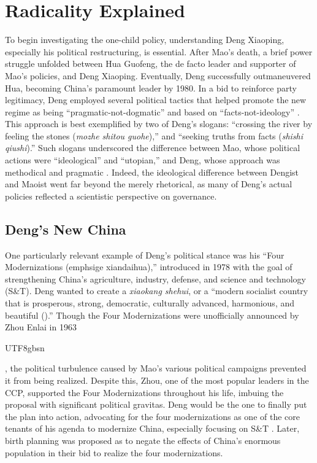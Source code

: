 \documentclass[12pt, a4paper, twoside]{article}
\begin{document}
\section{Radicality Explained}

To begin investigating the one-child policy, understanding Deng Xiaoping, especially his political restructuring, is essential. After Mao’s death, a brief power struggle unfolded between Hua Guofeng, the de facto leader and supporter of Mao’s policies, and Deng Xiaoping. Eventually, Deng successfully outmaneuvered Hua, becoming China’s paramount leader by 1980. In a bid to reinforce party legitimacy, Deng employed several political tactics that helped promote the new regime as being “pragmatic-not-dogmatic” and based on “facts-not-ideology” \autocite[p.\ 97]{Greenhalgh2008JustOneChild}. This approach is best exemplified by two of Deng’s slogans: “crossing the river by feeling the stones (\emph{mozhe shitou guohe}),” and “seeking truths from facts (\emph{shishi qiushi}).” Such slogans underscored the difference between Mao, whose political actions were “ideological” and “utopian,” and Deng, whose approach was methodical and pragmatic \autocite[p.\ 97]{Greenhalgh2008JustOneChild}. Indeed, the ideological difference between Dengist and Maoist went far beyond the merely rhetorical, as many of Deng’s actual policies reflected a scientistic perspective on governance.

\subsection{Deng's New China}

One particularly relevant example of Deng’s political stance was his “Four Modernizations (emph{sige xiandaihua}),” introduced in 1978 with the goal of strengthening China’s agriculture, industry, defense, and science and technology (S\&T). Deng wanted to create a \emph{xiaokang shehui}, or a “modern socialist country that is prosperous, strong, democratic, culturally advanced, harmonious, and beautiful (\cites{LiNan2018ThirdPlenumCommunique}{Xinhua2020Xiaokang}).” Though the Four Modernizations were unofficially announced by Zhou Enlai in 1963 \begin{CJK}{UTF8}{gbsn}\autocite{RenminArchive2016ScienceTechMeeting}\end{CJK}, the political turbulence caused by Mao’s various political campaigns prevented it from being realized. Despite this, Zhou, one of the most popular leaders in the CCP, supported the Four Modernizations throughout his life, imbuing the proposal with significant political gravitas. Deng would be the one to finally put the plan into action, advocating for the four modernizations as one of the core tenants of his agenda to modernize China, especially focusing on S\&T \autocite[p.\ 94]{Greenhalgh2008JustOneChild}. Later, birth planning was proposed as to negate the effects of China’s enormous population in their bid to realize the four modernizations.
\end{document}
